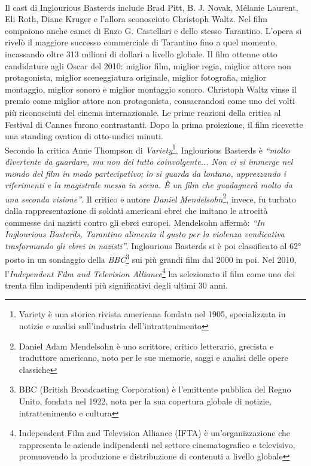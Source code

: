 \documentclass[12pt]{article} %
\begin{document}
\begin{flushleft}
    \\\vspace{1cm}
    Il cast di Inglourious Basterds include Brad Pitt, B. J. Novak, Mélanie Laurent, Eli Roth, Diane Kruger e l'allora sconosciuto Christoph Waltz. Nel film compaiono anche camei di Enzo G. Castellari e dello stesso Tarantino. L’opera si rivelò il maggiore successo commerciale di Tarantino fino a quel momento, incassando oltre 313 milioni di dollari a livello globale. 
    Il film ottenne otto candidature agli Oscar del 2010: miglior film, miglior regia, miglior attore non protagonista, miglior sceneggiatura originale, miglior fotografia, miglior montaggio, miglior sonoro e miglior montaggio sonoro. Christoph Waltz vinse il premio come miglior attore non protagonista, consacrandosi come uno dei volti più riconosciuti del cinema internazionale.
    Le prime reazioni della critica al Festival di Cannes furono contrastanti. Dopo la prima proiezione, il film ricevette una standing ovation di otto-undici minuti. \\\vspace{1cm} Secondo la critica Anne Thompson di \textit{Variety}\footnote{Variety è una storica rivista americana fondata nel 1905, specializzata in notizie e analisi sull'industria dell'intrattenimento}, Inglourious Basterds è \textit{“molto divertente da guardare, ma non del tutto coinvolgente... Non ci si immerge nel mondo del film in modo partecipativo; lo si guarda da lontano, apprezzando i riferimenti e la magistrale messa in scena. È un film che guadagnerà molto da una seconda visione”}. 
    Il critico e autore \textit{Daniel Mendelsohn}\footnote{Daniel Adam Mendelsohn è uno scrittore, critico letterario, grecista e traduttore americano, noto per le sue memorie, saggi e analisi delle opere classiche}, invece, fu turbato dalla rappresentazione di soldati americani ebrei che imitano le atrocità commesse dai nazisti contro gli ebrei europei. Mendelsohn affermò: \textit{“In Inglourious Basterds, Tarantino alimenta il gusto per la violenza vendicativa trasformando gli ebrei in nazisti”}.
    Inglourious Basterds si è poi classificato al 62° posto in un sondaggio della \textit{BBC}\footnote{BBC (British Broadcasting Corporation) è l'emittente pubblica del Regno Unito, fondata nel 1922, nota per la sua copertura globale di notizie, intrattenimento e cultura} sui più grandi film dal 2000 in poi. Nel 2010, l'\textit{Independent Film and Television Alliance}\footnote{Independent Film and Television Alliance (IFTA) è un'organizzazione che rappresenta le aziende indipendenti nel settore cinematografico e televisivo, promuovendo la produzione e distribuzione di contenuti a livello globale} ha selezionato il film come uno dei trenta film indipendenti più significativi degli ultimi 30 anni.

\end{flushleft}
\end{document}
